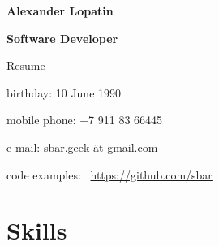 \begin{center}
\fontsize{16pt}{12pt}\selectfont
\bfseries Alexander Lopatin\mdseries

\fontsize{12pt}{12pt}\selectfont
\bfseries Software Developer\mdseries

Resume
\end{center}
{
\fontsize{10pt}{8pt}\selectfont
\begin{center}
\item birthday: 10 June 1990
\item mobile phone: +7 911 83 66445
\item e-mail: sbar.geek ät gmail.com
\item code examples: \
\href{https://github.com/sbar?tab=repositories}{https://github.com/sbar}
\end{center}
}


\fontsize{11pt}{12pt}\selectfont

\section{Skills}

